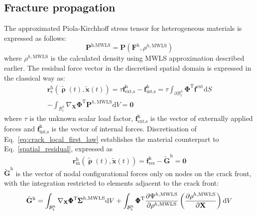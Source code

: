 \documentclass[onecolumn]{svjour3}
\begin{document}
\subsection{Fracture propagation} \label{sec:fem_fracture_prop}
% 
The approximated Piola-Kirchhoff stress tensor for heterogeneous materials is expressed as follows:
\begin{equation}
	\mathbf{P}^{\textrm{h},\textrm{MWLS}} = 
		\mathbf{P}(
		\mathbf{F}^\textrm{h}, \rho^{h,\textrm{MWLS}})
\end{equation}
where $\rho^{h,\textrm{MWLS}}$ is the calculated density using MWLS approximation described earlier.
The residual force vector in the discretised spatial domain is expressed in the classical way as:
\begin{equation}
\begin{aligned}
\label{spatial_residual}
	\mathbf{r}_\textrm{s}^\textrm{h}(\tilde{\pmb\uprho}(t), \tilde{\mathbf{x}}(t)) = \tau\mathbf{f}^\textrm{h}_\textrm{ext,s}-\mathbf{f}^\textrm{h}_\textrm{int,s}= 
	\tau \int_{\partial\mathcal{B}^h_t} \pmb{\Phi}^\textrm{T}
	\mathbf{f}^\textrm{ext}
	\textrm{d}S\\
	- \int_{\mathcal{B}^h_t} \nabla_\mathbf{X} \pmb{\Phi}^\textrm{T}
	\mathbf{P}^{h,\textrm{MWLS}}\textrm{d}V=\mathbf{0}
	\end{aligned}
\end{equation}
where $\tau$ is the unknown scalar load factor, $\mathbf{f}^\textrm{h}_\textrm{ext,s}$ is the vector of externally applied forces and $\mathbf{f}^\textrm{h}_\textrm{int,s}$ is the vector of internal forces. 
% 
Discretisation of Eq.~\ref{eq:crack_local_first_law} establishes the material counterpart to Eq.~\ref{spatial_residual}, expressed as
\begin{equation}
\label{material_residual}
\mathbf{r}_\textrm{m}^\textrm{h}(\tilde{\pmb\uprho}(t), \tilde{\mathbf{x}}(t)) = \mathbf{f}^\textrm{h}_\textrm{res}-\tilde{\mathbf{G}}^\textrm{h}=\mathbf{0}
\end{equation}
$\tilde{\mathbf{G}}^\textrm{h}$ is the vector of nodal configurational forces only on nodes on the crack front, with the integration restricted to elements adjacent to the crack front:
\begin{equation}
\begin{aligned}
	\tilde{\mathbf{G}}^\textrm{h} =
	\int_{\mathcal{B}^h_t}
		\nabla_\mathbf{X}\pmb{\Phi}^\textrm{T} {\pmb\Sigma}^{h,\textrm{MWLS}}
	\textrm{d}V 
	+
	\int_{\mathcal{B}^h_t}
		\pmb{\Phi}^\textrm{T} \dfrac{\partial {\Psi}^{h,\textrm{MWLS}} }{\partial \rho^{h,\rm{MWLS}}}
		\left(
			\frac{\partial 
			\rho^{h,\textrm{MWLS}}}{\partial \mathbf{X}}
		\right)
	\textrm{d}V
	\label{eq:mat_int_front}
	\end{aligned}
\end{equation}
\end{document}

